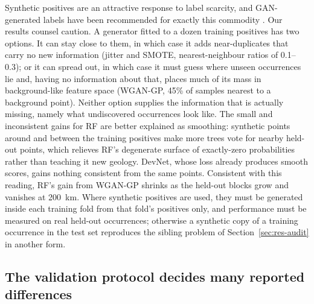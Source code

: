 \documentclass[pdflatex,sn-apa]{sn-jnl}
\begin{document}
Synthetic positives are an attractive response to label scarcity, and GAN-generated labels have been recommended for exactly this commodity \citep{Parsa2025}. Our results counsel caution. A generator fitted to a dozen training positives has two options. It can stay close to them, in which case it adds near-duplicates that carry no new information (jitter and SMOTE, nearest-neighbour ratios of 0.1--0.3); or it can spread out, in which case it must guess where unseen occurrences lie and, having no information about that, places much of its mass in background-like feature space (WGAN-GP, 45\% of samples nearest to a background point). Neither option supplies the information that is actually missing, namely what undiscovered occurrences look like. The small and inconsistent gains for RF are better explained as smoothing: synthetic points around and between the training positives make more trees vote for nearby held-out points, which relieves RF's degenerate surface of exactly-zero probabilities rather than teaching it new geology. DevNet, whose loss already produces smooth scores, gains nothing consistent from the same points. Consistent with this reading, RF's gain from WGAN-GP shrinks as the held-out blocks grow and vanishes at 200~km. Where synthetic positives are used, they must be generated inside each training fold from that fold's positives only, and performance must be measured on real held-out occurrences; otherwise a synthetic copy of a training occurrence in the test set reproduces the sibling problem of Section~\ref{sec:res-audit} in another form.

\subsection{The validation protocol decides many reported differences}\label{sec:disc-protocol}
\end{document}
